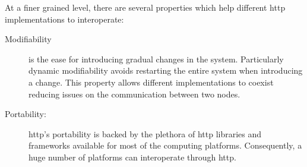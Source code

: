 At a finer grained level, there are several properties which help different \ac{http} implementations to interoperate: %
\begin{description}
  \item[Modifiability] is the ease for introducing gradual changes in the system.
                       Particularly dynamic modifiability avoids restarting the entire system when introducing a change.
                       This property allows different implementations to coexist
                       reducing issues on the communication between two nodes.
                       
  
  \item[Portability:] \ac{http}'s portability is backed by the plethora of \ac{http} libraries and frameworks available for most of the computing platforms.
                    Consequently, a huge number of platforms can interoperate through \ac{http}.
\end{description}

\bigskip

